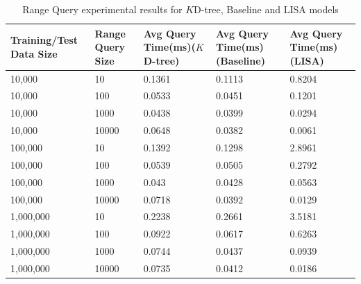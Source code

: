 \begin{table}
	\centering
\centering
	\begin{tabular}{||p{}<{\centering}|p{}<{\centering}|p{}<{\centering}|p{}<{\centering}|p{}<{\centering}||}
		\hline
		Training/Test Data Size& Range Query Size & Avg Query Time(ms)($K$D-tree) & Avg Query Time(ms)(Baseline)&Avg Query Time(ms)(LISA)\\ [0.5ex] 
		\hline
		\hline
	 	10,000& 10& 0.1361 & 0.1113& 0.8204 \\
	 	\hline
	 	10,000& 100& 0.0533 & 0.0451& 0.1201 \\
	 	\hline
	 	10,000& 1000& 0.0438 & 0.0399& 0.0294 \\
 	 	\hline
 	 	10,000& 10000& 0.0648&0.0382&0.0061 \\
	 	\hline
	 	100,000& 10& 0.1392 & 0.1298&2.8961 \\
	 	\hline
	 	100,000& 100& 0.0539 & 0.0505&0.2792 \\
	 	\hline
	 	100,000& 1000& 0.043 & 0.0428&  0.0563 \\
 	 	\hline
 	 	100,000& 10000&0.0718& 0.0392& 0.0129 \\
	 	\hline
	    1,000,000& 10& 0.2238 & 0.2661& 3.5181 \\
	 	\hline
	 	1,000,000& 100& 0.0922 & 0.0617&0.6263 \\
	 	\hline
	 	1,000,000& 1000& 0.0744 & 0.0437 &0.0939 \\
	 	\hline
	 	1,000,000& 10000& 0.0735 & 0.0412 &0.0186 \\
	 	
	 
		\hline
		\hline
	\end{tabular}
	\caption{Range Query experimental results for $K$D-tree, Baseline and LISA models}
	\label{Range_Query_Experimental_Results}

\end{table}

